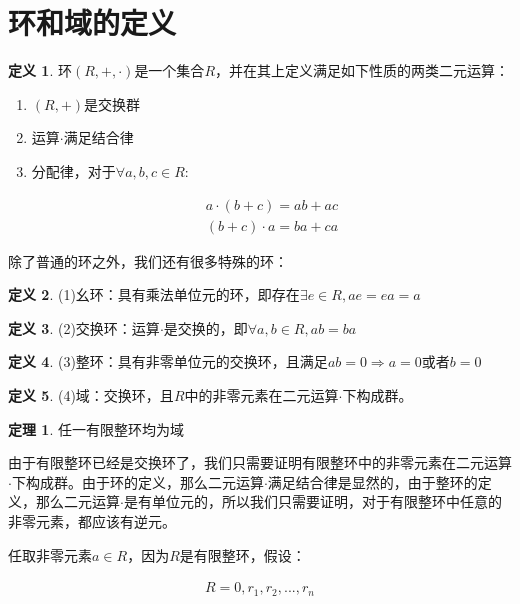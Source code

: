 \documentclass[12pt, a4paper, oneside]{ctexart}
\theoremstyle{definition}
\newtheorem*{definition}{定义}
\newtheorem*{theorem}{定理}
\begin{document}
\section*{环和域的定义}

\begin{definition}
环$(R,+,\cdot)$是一个集合$R$，并在其上定义满足如下性质的两类二元运算：
\begin{enumerate}
\item $(R,+)$是交换群
\item 运算$\cdot$满足结合律
\item 分配律，对于$\forall a,b,c\in R$:

\begin{align*}
a\cdot(b+c)=ab+ac\\
(b+c)\cdot a=ba+ca
\end{align*}

\end{enumerate}
\end{definition}
除了普通的环之外，我们还有很多特殊的环：

\begin{definition}
(1)幺环：具有乘法单位元的环，即存在$\exists e\in R,ae=ea=a$
\end{definition}

\begin{definition}
(2)交换环：运算$\cdot$是交换的，即$\forall a,b\in R, ab=ba$
\end{definition}

\begin{definition}
(3)整环：具有非零单位元的交换环，且满足$ab=0\Rightarrow a=0$或者$b=0$
\end{definition}

\begin{definition}
(4)域：交换环，且$R$中的非零元素在二元运算$\cdot$下构成群。
\end{definition}

\begin{theorem}
任一有限整环均为域
\end{theorem}

由于有限整环已经是交换环了，我们只需要证明有限整环中的非零元素在二元运算$\cdot$下构成群。由于环的定义，那么二元运算$\cdot$满足结合律是显然的，由于整环的定义，那么二元运算$\cdot$是有单位元的，所以我们只需要证明，对于有限整环中任意的非零元素，都应该有逆元。

任取非零元素$a\in R$，因为$R$是有限整环，假设：

\begin{align*}
R={0,r_1,r_2,...,r_n}
\end{align*}
\end{document}
